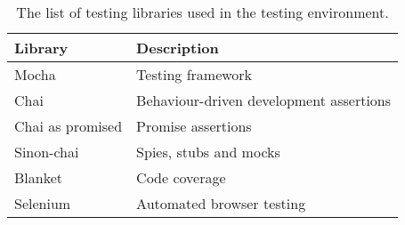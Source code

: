 
\begin{table}[H]
\caption[Testing environment]{The list of testing libraries used in the testing environment.}
\label{tab:testing_environment}
\begin{tabularx}{\textwidth}{@{}XX@{}}
	\toprule
	\textbf{Library} & \textbf{Description} \\
	\midrule
	Mocha & Testing framework \\
	Chai & Behaviour-driven development assertions \\
	Chai as promised & Promise assertions \\
	Sinon-chai & Spies, stubs and mocks \\
	Blanket & Code coverage \\
	Selenium & Automated browser testing \\
	\bottomrule
\end{tabularx}
\end{table}